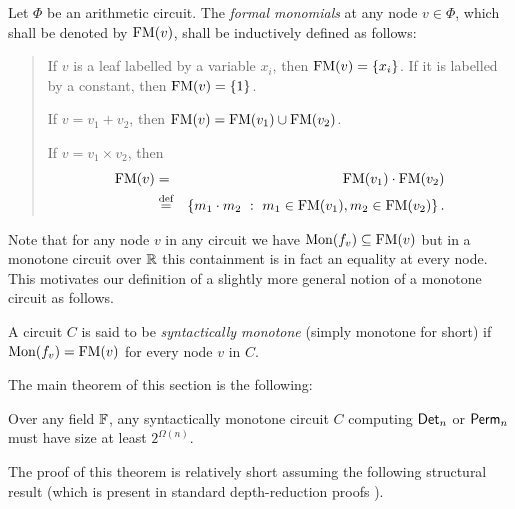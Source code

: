 \begin{definition}
  Let $\Phi$ be an arithmetic circuit. The \emph{formal monomials} at any node $v\in \Phi$, which shall be denoted by $\mathrm{FM}(v)$, shall be inductively defined as follows:
  \begin{quote}
    If $v$ is a leaf labelled by a variable $x_i$, then $\mathrm{FM}(v) = \left\{x_i\right\}$. If it is labelled by a constant, then $\mathrm{FM}(v) = \left\{1\right\}$.
    
    If $v = v_1 + v_2$, then $\mathrm{FM}(v) = \mathrm{FM}(v_1) \cup \mathrm{FM}(v_2)$. 
    
    If $v = v_1 \times v_2$, then 
    \begin{eqnarray*}
      \mathrm{FM}(v) &=& \mathrm{FM}(v_1)\cdot \mathrm{FM}(v_2)\\
      &\stackrel{\text{def}}{=}& \left\{{m_1\cdot m_2}\ : \ {m_1 \in \mathrm{FM}(v_1), m_2\in \mathrm{FM}(v_2)}\right\}.
    \end{eqnarray*}
  \end{quote}
\end{definition}

\noindent Note that for any node $v$ in any circuit we have $\mathrm{Mon}(f_{v}) \subseteq \mathrm{FM}(v)$ but in a monotone circuit over $\mathbb{R}$ this containment is in fact an equality at every node. This motivates our definition of a slightly more general notion of a monotone circuit as follows.

	
\begin{definition}
  A circuit $C$ is said to be \emph{syntactically monotone} (simply monotone for short) if $\mathrm{Mon}(f_{v}) = \mathrm{FM}(v)$ for every node $v$ in $C$.
\end{definition}
	
	
	
The main theorem of this section is the following: 

\begin{theorem}[\cite{js82}]\label{thm:monotone-circuit-lbs}
  Over any field $\mathbb{F}$, any syntactically monotone circuit $C$ computing $\mathsf{Det}_n$ or $\mathsf{Perm}_n$ must have size at least $2^{\Omega(n)}$.
\end{theorem}

The proof of this theorem is relatively short assuming the following structural result (which is present in standard depth-reduction proofs \cite{vsbr83,ajmv98}).

